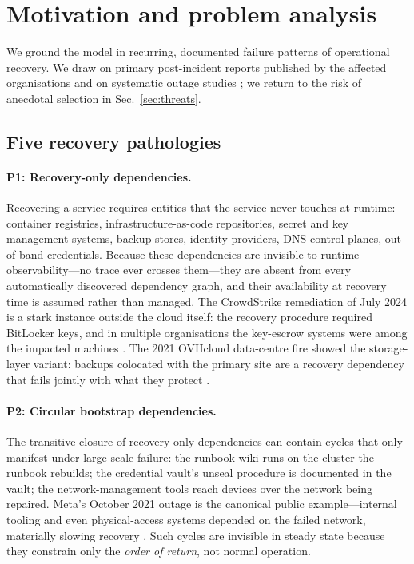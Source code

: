 \section{Motivation and problem analysis}
\label{sec:motivation}

We ground the model in recurring, documented failure patterns of operational recovery. We draw on primary post-incident reports published by the affected organisations and on systematic outage studies \citep{gunawi2016cloud,liu2019bugs,ghosh2022fight}; we return to the risk of anecdotal selection in Sec.~\ref{sec:threats}.

\subsection{Five recovery pathologies}
\label{sec:pathologies}

\paragraph{P1: Recovery-only dependencies.}
Recovering a service requires entities that the service never touches at runtime: container registries, infrastructure-as-code repositories, secret and key management systems, backup stores, identity providers, DNS control planes, out-of-band credentials. Because these dependencies are invisible to runtime observability---no trace ever crosses them---they are absent from every automatically discovered dependency graph, and their availability at recovery time is assumed rather than managed. The CrowdStrike remediation of July 2024 is a stark instance outside the cloud itself: the recovery procedure required BitLocker keys, and in multiple organisations the key-escrow systems were among the impacted machines \citep{crowdstrike2024rca,microsoft2024kb}. The 2021 OVHcloud data-centre fire showed the storage-layer variant: backups colocated with the primary site are a recovery dependency that fails jointly with what they protect \citep{reuters2021ovh}.

\paragraph{P2: Circular bootstrap dependencies.}
The transitive closure of recovery-only dependencies can contain cycles that only manifest under large-scale failure: the runbook wiki runs on the cluster the runbook rebuilds; the credential vault's unseal procedure is documented in the vault; the network-management tools reach devices over the network being repaired. Meta's October 2021 outage is the canonical public example---internal tooling and even physical-access systems depended on the failed network, materially slowing recovery \citep{meta2021outage}. Such cycles are invisible in steady state because they constrain only the \emph{order of return}, not normal operation.

